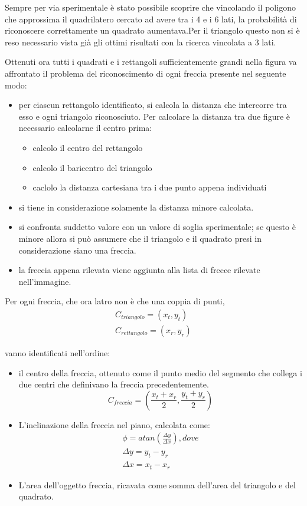 Sempre per via sperimentale è stato possibile scoprire che vincolando il poligono che approssima il quadrilatero cercato ad avere tra i 4 e i 6 lati, la probabilità di riconoscere correttamente un quadrato aumentava.Per il triangolo questo non si è reso necessario vista già gli ottimi risultati con la ricerca vincolata a 3 lati.

Ottenuti ora tutti i quadrati e i rettangoli sufficientemente grandi nella figura va affrontato il problema del riconoscimento di ogni freccia presente nel seguente modo:
\begin{itemize}
	\item \textbf{} per ciascun rettangolo identificato, si calcola la distanza che intercorre tra esso e ogni triangolo riconosciuto. Per calcolare la distanza tra due figure è necessario calcolarne il centro prima:
	\begin{itemize}
		\item \textbf{}calcolo il centro del rettangolo
		\item \textbf{}calcolo il baricentro del triangolo
		\item \textbf{}caclolo la distanza cartesiana tra i due punto appena individuati
	\end{itemize}
	\item \textbf{} si tiene in considerazione solamente la distanza minore calcolata.
	\item \textbf{} si confronta suddetto valore con un valore di soglia sperimentale; se questo è minore allora si può assumere che il triangolo e il quadrato presi in considerazione siano una freccia.
	\item \textbf{} la freccia appena rilevata viene aggiunta alla lista di frecce rilevate nell'immagine.
\end{itemize}
Per ogni freccia, che ora latro non è che una coppia di punti,
\begin{equation}
	\begin{split}
		C_{triangolo}=(x_t,y_t)\\ 
		C_{rettangolo}=(x_r,y_r)
	\end{split}
\end{equation}

vanno identificati nell'ordine:
\begin{itemize}
	\item \textbf{}il centro della freccia, ottenuto come il punto medio del segmento che collega i due centri che definivano la freccia precedentemente.
	$$
		C_{freccia}=(\dfrac{x_t+x_r}{2},\dfrac{y_t+y_r}{2})
	$$
	\item \textbf{}L'inclinazione della freccia nel piano, calcolata come:
		\begin{equation}
			\begin{split}
				\phi=atan(\frac{\Delta y}{\Delta x}), dove\\
				\Delta y=y_t-y_r\\
				\Delta x=x_t-x_r
			\end{split}
		\end{equation}
	\item \textbf{}L'area dell'oggetto freccia, ricavata come somma dell'area del triangolo e del quadrato.
	
	
	

\end{itemize}	